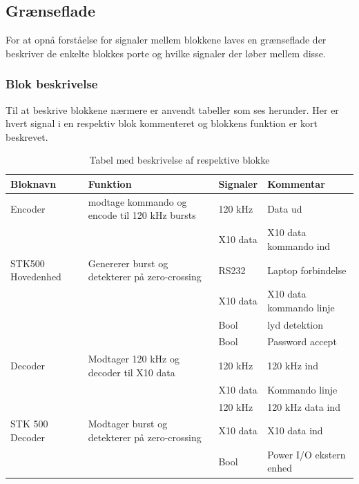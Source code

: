 \clearpage
\newpage

\begin{table}[htbp] %
\subsection{Grænseflade}
For at opnå forståelse for signaler mellem blokkene laves en grænseflade der beskriver de enkelte blokkes porte og hvilke signaler der løber mellem disse.

\subsubsection{Blok beskrivelse}
Til at beskrive blokkene nærmere er anvendt tabeller som ses herunder. Her er hvert signal i en respektiv blok kommenteret og blokkens funktion er kort beskrevet. 

\caption{Tabel med beskrivelse af respektive blokke}
\begin{small}
\begin{tabular}{|p{}|p{}|p{}|p{}|}
\hline
\textbf{Bloknavn} & \textbf{Funktion} & \textbf{Signaler} & \textbf{Kommentar} \\ \hline

Encoder & modtage kommando og encode til 120 kHz bursts & 120 kHz & Data ud \\ \cline{3-4}	
& & X10 data & X10 data kommando ind \\ \hline

STK500 Hovedenhed & Genererer burst og detekterer på zero-crossing & RS232 & Laptop forbindelse \\ \cline{3-4}
& & X10 data & X10 data kommando linje \\ \cline{3-4}
& & Bool & lyd detektion \\ \cline{3-4}
& & Bool & Password accept \\ \hline

Decoder & Modtager 120 kHz og decoder til X10 data & 120 kHz & 120 kHz ind \\ \cline{3-4}
& & X10 data & Kommando linje \\ \cline{3-4}
& & 120 kHz & 120 kHz data ind \\ \hline

STK 500 Decoder & Modtager burst og detekterer på zero-crossing & X10 data & X10 data ind \\ \cline{3-4}
&& Bool & Power I/O ekstern enhed \\ \hline 
\end{tabular}
\end{small}
\label{table:Bloktabel}
\end{table}

